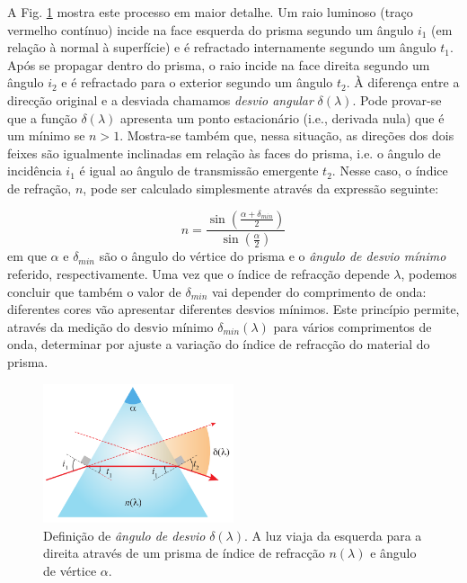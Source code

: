 \documentclass[a4paper,twoside,11pt]{report}      %
\begin{document}
A Fig. \ref{fig:prisma2} mostra este processo em maior detalhe. Um raio luminoso (traço vermelho contínuo) incide na face esquerda do prisma segundo um ângulo $i_1$ (em relação à normal à superfície) e é refractado internamente segundo um ângulo $t_1$. Após se propagar dentro do prisma, o raio incide na face direita segundo um ângulo $i_2$ e é refractado para o exterior segundo um ângulo $t_2$. À diferença entre a direcção original e a desviada chamamos \emph{desvio angular} $\delta(\lambda)$. Pode provar-se que a função $\delta(\lambda)$ apresenta um ponto estacionário (i.e., derivada nula) que é um mínimo se $n > 1$. Mostra-se também que, nessa situação, as direções dos dois feixes são igualmente inclinadas em relação às faces do prisma, i.e.  o ângulo de incidência $i_1$ é igual ao ângulo de transmissão emergente $t_2$. Nesse caso, o índice de refração, $n$, pode ser calculado simplesmente através da expressão seguinte: 

\begin{equation}
	\label{eq:desviomim}
	n= \frac{\sin \left( \frac{\alpha+ \delta_{min}}{2} \right) } {\sin \left(  \frac{\alpha}{2} \right)}  
\end{equation}
em que $\alpha$ e  $\delta_{min}$ são o ângulo do vértice do prisma e o \emph{ângulo de desvio mínimo} referido, respectivamente. Uma vez que o índice de refracção depende $\lambda$, podemos concluir que também o valor de $\delta_{min}$ vai depender do comprimento de onda: diferentes cores vão apresentar diferentes desvios mínimos. Este princípio permite, através da medição do desvio mínimo $\delta_{min}(\lambda)$ para vários comprimentos de onda, determinar por ajuste a variação do índice de refracção do material do prisma.


\begin{figure}[htb]  \centering 
	\includegraphics[width=0.5\textwidth]{prisma2.pdf}
	\caption{Definição de \emph{ângulo de desvio} $\delta(\lambda)$. A luz viaja da esquerda para a direita através de um prisma de índice de refracção $n(\lambda)$ e ângulo de vértice $\alpha$. \label{fig:prisma2}} 
\end{figure}
\end{document}
